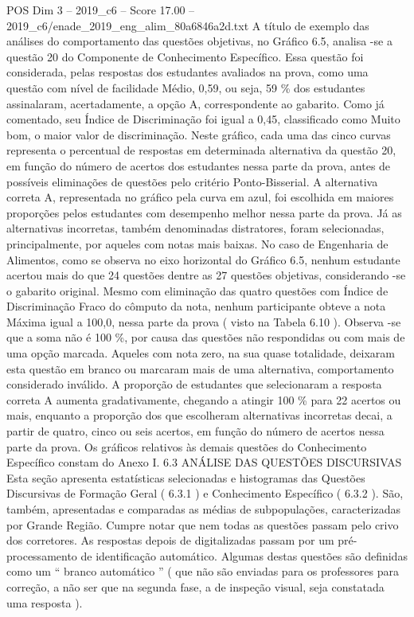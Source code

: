 \begin{textsample}{POS Dim 3 – 2019\_c6 – Score 17.00 – 2019\_c6/enade\_2019\_eng\_alim\_80a6846a2d.txt}
A título de exemplo das análises do comportamento das questões objetivas, no Gráfico 6.5, analisa -se a questão 20 do Componente de Conhecimento Específico.
Essa questão foi considerada, pelas respostas dos estudantes avaliados na prova, como uma questão com nível de facilidade Médio, 0,59, ou seja, 59 \% dos estudantes assinalaram, acertadamente, a opção A, correspondente ao gabarito.
Como já comentado, seu Índice de Discriminação foi igual a 0,45, classificado como Muito bom, o maior valor de discriminação.
Neste gráfico, cada uma das cinco curvas representa o percentual de respostas em determinada alternativa da questão 20, em função do número de acertos dos estudantes nessa parte da prova, antes de possíveis eliminações de questões pelo critério Ponto-Bisserial.
A alternativa correta A, representada no gráfico pela curva em azul, foi escolhida em maiores proporções pelos estudantes com desempenho melhor nessa parte da prova.
Já as alternativas incorretas, também denominadas distratores, foram selecionadas, principalmente, por aqueles com notas mais baixas.
No caso de Engenharia de Alimentos, como se observa no eixo horizontal do Gráfico 6.5, nenhum estudante acertou mais do que 24 questões dentre as 27 questões objetivas, considerando -se o gabarito original.
Mesmo com eliminação das quatro questões com Índice de Discriminação Fraco do cômputo da nota, nenhum participante obteve a nota Máxima igual a 100,0, nessa parte da prova ( visto na Tabela 6.10 ).
Observa -se que a soma não é 100 \%, por causa das questões não respondidas ou com mais de uma opção marcada.
Aqueles com nota zero, na sua quase totalidade, deixaram esta questão em branco ou marcaram mais de uma alternativa, comportamento considerado inválido.
A proporção de estudantes que selecionaram a resposta correta A aumenta gradativamente, chegando a atingir 100 \% para 22 acertos ou mais, enquanto a proporção dos que escolheram alternativas incorretas decai, a partir de quatro, cinco ou seis acertos, em função do número de acertos nessa parte da prova.
Os gráficos relativos às demais questões do Conhecimento Específico constam do Anexo I. 6.3 ANÁLISE DAS QUESTÕES DISCURSIVAS Esta seção apresenta estatísticas selecionadas e histogramas das Questões Discursivas de Formação Geral ( 6.3.1 ) e Conhecimento Específico ( 6.3.2 ).
São, também, apresentadas e comparadas as médias de subpopulações, caracterizadas por Grande Região.
Cumpre notar que nem todas as questões passam pelo crivo dos corretores.
As respostas depois de digitalizadas passam por um pré-processamento de identificação automático.
Algumas destas questões são definidas como um “ branco automático ” ( que não são enviadas para os professores para correção, a não ser que na segunda fase, a de inspeção visual, seja constatada uma resposta ).

\end{textsample}
